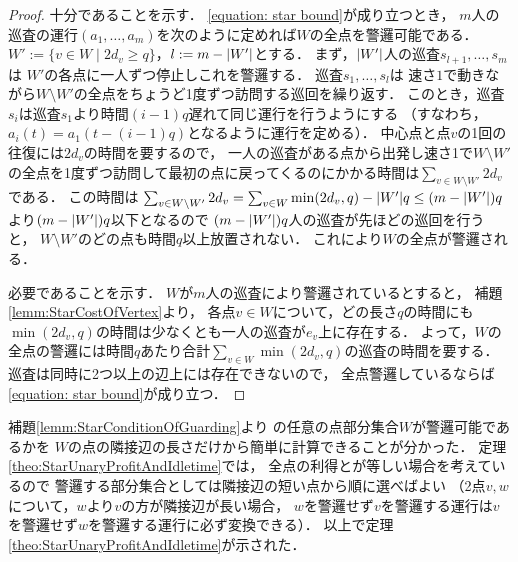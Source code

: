 \begin{proof}
  十分であることを示す．
  \eqref{equation: star bound}が成り立つとき，
  $m$人の巡査の運行$(a_1, \ldots, a_m)$を次のように定めれば$W$の全点を警邏可能である．
  $W' := \{ v \in W \mid 2d_v \geq q \}$，$l := m - \lvert{W'}\rvert$とする．
  まず，$\lvert{W'}\rvert$人の巡査$s_{l + 1}, \ldots, s_m$は
  $W'$の各点に一人ずつ停止しこれを警邏する．
  巡査$s_1, \ldots, s_l$は
  速さ$1$で動きながら$W \setminus W'$の全点をちょうど1度ずつ訪問する巡回を繰り返す．
  このとき，巡査$s_i$は巡査$s_1$より時間$(i - 1)q$遅れて同じ運行を行うようにする
  （すなわち，$a_i(t) = a_1(t - (i - 1)q)$となるように運行を定める）．
  中心点と点$v$の1回の往復には$2d_v$の時間を要するので，
  一人の巡査がある点から出発し速さ1で$W \setminus W'$の全点を1度ずつ訪問して最初の点に戻ってくるのにかかる時間は$\sum_{v \in W \setminus W'} 2d_v$である．
  この時間は
  $\sum_{v \in W \setminus W'} 2d_v
    = \sum_{v \in W} \min(2d_v, q) - \lvert{W'}\rvert q
    \leq (m - \lvert{W'}\rvert)q$より$(m - \lvert{W'}\rvert)q$以下となるので
  $(m - \lvert{W'}\rvert)q$人の巡査が先ほどの巡回を行うと，
  $W \setminus W'$のどの点も時間$q$以上放置されない．
  これにより$W$の全点が警邏される．

  必要であることを示す．
  $W$が$m$人の巡査により警邏されているとすると，
  補題\ref{lemm:StarCostOfVertex}より，
  各点$v \in W$について，どの長さ$q$の時間にも
  $\min(2d_v, q)$の時間は少なくとも一人の巡査が$e_v$上に存在する．
  よって，$W$の全点の警邏には時間$q$あたり合計$\sum_{v \in W} \min(2d_v, q)$の巡査の時間を要する．
  巡査は同時に2つ以上の辺上には存在できないので，
  全点警邏しているならば\eqref{equation: star bound}が成り立つ．
\end{proof}


補題\ref{lemm:StarConditionOfGuarding}より
{\graphStar}の任意の点部分集合$W$が警邏可能であるかを
$W$の点の隣接辺の長さだけから簡単に計算できることが分かった．
定理\ref{theo:StarUnaryProfitAndIdletime}では，
全点の利得と{\maxIdletime}が等しい場合を考えているので
警邏する部分集合としては隣接辺の短い点から順に選べばよい
（2点$v, w$について，$w$より$v$の方が隣接辺が長い場合，
$w$を警邏せず$v$を警邏する運行は$v$を警邏せず$w$を警邏する運行に必ず変換できる）．
以上で定理\ref{theo:StarUnaryProfitAndIdletime}が示された．
